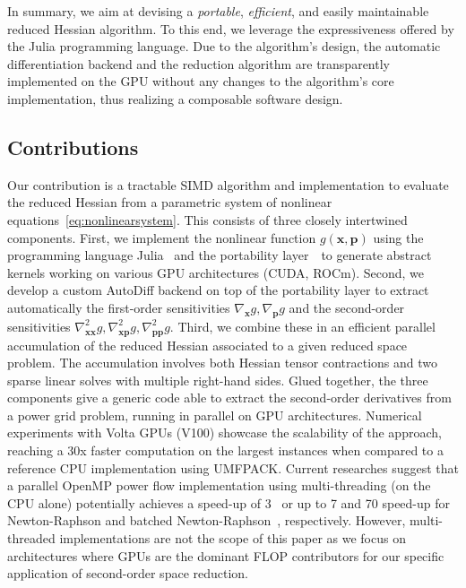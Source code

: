 In summary, we aim at devising a \emph{portable}, \emph{efficient}, and easily maintainable reduced Hessian algorithm. To this end, we leverage
the expressiveness offered by the Julia programming language. Due to the algorithm's design,
the automatic differentiation backend and the reduction algorithm are transparently implemented on the GPU
without any changes to the algorithm's core implementation, thus realizing a composable software design.

\subsection{Contributions}
Our contribution is a tractable SIMD algorithm and implementation
to evaluate the reduced Hessian from a parametric system of nonlinear equations~\eqref{eq:nonlinearsystem}.
This consists of three closely intertwined components.
%
First, we implement the nonlinear function $g(\bm{x}, \bm{p})$
using the programming language Julia~\cite{bezanson2017julia}
and the portability layer~\KA\ to generate abstract kernels
working on various GPU architectures (CUDA, ROCm).
%
Second, we develop a custom AutoDiff backend on top of the portability
layer to extract automatically the first-order sensitivities $\nabla_{\bm{x}} g, \nabla_{\bm{p}} g$
and the second-order sensitivities $\nabla_{\bm{x}\bm{x}}^2 g, \nabla_{\bm{x}\bm{p}}^2g, \nabla_{\bm{p}\bm{p}}^2 g$.
%
Third, we combine these in an efficient parallel accumulation of the reduced
Hessian associated to a given reduced space problem.
The accumulation involves both Hessian tensor contractions and two sparse linear solves
with multiple right-hand sides.
Glued together, the three components give a generic code
able to extract the second-order derivatives from a power grid problem,
running in parallel on GPU architectures.
Numerical experiments with Volta GPUs (V100)
showcase the scalability of the approach, reaching a 30x faster computation on the largest instances when compared to a reference CPU implementation using UMFPACK. Current researches suggest that a parallel OpenMP power flow implementation using multi-threading (on the CPU alone) potentially achieves a speed-up of 3~\cite{ahmadi2018parallel} or up to 7 and 70 speed-up for Newton-Raphson and batched Newton-Raphson~\cite{2021MTNR}, respectively. However, multi-threaded implementations are not the scope of this paper as we focus on architectures where GPUs are the dominant FLOP contributors for our specific application of second-order space reduction.

